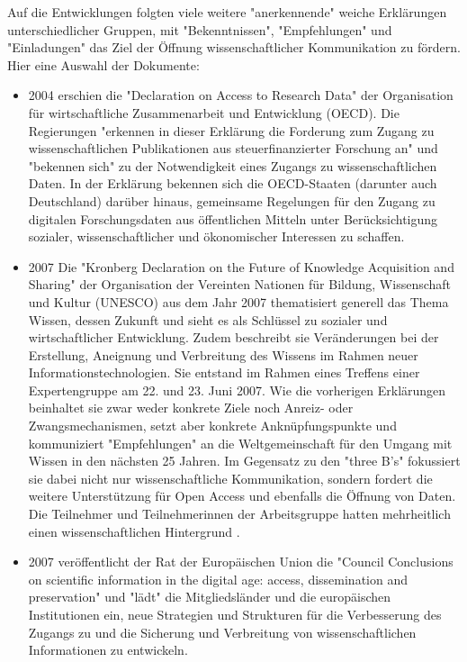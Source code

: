 Auf die Entwicklungen folgten viele weitere "anerkennende" weiche Erklärungen unterschiedlicher Gruppen, mit "Bekenntnissen", "Empfehlungen" und "Einladungen" das Ziel der Öffnung wissenschaftlicher Kommunikation zu fördern. Hier eine Auswahl der Dokumente:
\begin{itemize}
\item 2004 erschien die "Declaration on Access to Research Data" \cite{OECD_2004} der Organisation für wirtschaftliche Zusammenarbeit und Entwicklung (OECD). Die Regierungen "erkennen in dieser Erklärung die Forderung zum Zugang zu wissenschaftlichen Publikationen aus steuerfinanzierter Forschung an" und "bekennen sich" zu der Notwendigkeit eines Zugangs zu wissenschaftlichen Daten. In der Erklärung bekennen sich die OECD-Staaten (darunter auch Deutschland) darüber hinaus, gemeinsame Regelungen für den Zugang zu digitalen Forschungsdaten aus öffentlichen Mitteln unter Berücksichtigung sozialer, wissenschaftlicher und ökonomischer Interessen zu schaffen.
\item 2007 Die "Kronberg Declaration on the Future of Knowledge Acquisition and Sharing" \cite{Kronberg_Declaration_2007} der Organisation der Vereinten Nationen für Bildung, Wissenschaft und Kultur (UNESCO) aus dem Jahr 2007 thematisiert generell das Thema Wissen, dessen Zukunft und sieht es als Schlüssel zu sozialer und wirtschaftlicher Entwicklung. Zudem beschreibt sie Veränderungen bei der Erstellung, Aneignung und Verbreitung des Wissens im Rahmen neuer Informationstechnologien. Sie entstand im Rahmen eines Treffens einer Expertengruppe am 22. und 23. Juni 2007. Wie die vorherigen Erklärungen beinhaltet sie zwar weder konkrete Ziele noch Anreiz- oder Zwangsmechanismen, setzt aber konkrete Anknüpfungspunkte und kommuniziert "Empfehlungen" an die Weltgemeinschaft für den Umgang mit Wissen in den nächsten 25 Jahren. Im Gegensatz zu den "three B's" fokussiert sie dabei nicht nur wissenschaftliche Kommunikation, sondern fordert die weitere Unterstützung für Open Access und ebenfalls die Öffnung von Daten. Die Teilnehmer und Teilnehmerinnen der Arbeitsgruppe hatten mehrheitlich einen wissenschaftlichen Hintergrund \cite{UNESCO_2007}.
\item 2007 veröffentlicht der Rat der Europäischen Union die "Council Conclusions on scientific information in the digital age: access, dissemination and preservation" \cite{EU_Council_2007} und "lädt" die Mitgliedsländer und die europäischen Institutionen ein, neue Strategien und Strukturen für die Verbesserung des Zugangs zu und die Sicherung und Verbreitung von wissenschaftlichen Informationen zu entwickeln.

\end{itemize}
